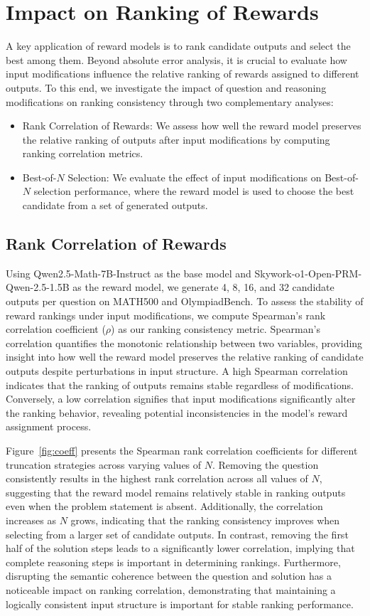 \documentclass{article}
\begin{document}
\section{Impact on Ranking of Rewards}\label{sec:bon}
A key application of reward models is to rank candidate outputs and select the best among them. Beyond absolute error analysis, it is crucial to evaluate how input modifications influence the relative ranking of rewards assigned to different outputs. To this end, we investigate the impact of question and reasoning modifications on ranking consistency through two complementary analyses:
\begin{itemize}
    \item Rank Correlation of Rewards: We assess how well the reward model preserves the relative ranking of outputs after input modifications by computing ranking correlation metrics.
    \item Best-of-$N$ Selection: We evaluate the effect of input modifications on Best-of-$N$ selection performance, where the reward model is used to choose the best candidate from a set of generated outputs.
\end{itemize}
\subsection{Rank Correlation of Rewards}
Using Qwen2.5-Math-7B-Instruct as the base model and Skywork-o1-Open-PRM-Qwen-2.5-1.5B as the reward model, we generate 4, 8, 16, and 32 candidate outputs per question on MATH500 and OlympiadBench. To assess the stability of reward rankings under input modifications, we compute Spearman's rank correlation coefficient ($\rho$) as our ranking consistency metric. Spearman’s correlation quantifies the monotonic relationship between two variables, providing insight into how well the reward model preserves the relative ranking of candidate outputs despite perturbations in input structure. A high Spearman correlation indicates that the ranking of outputs remains stable regardless of modifications. Conversely, a low correlation signifies that input modifications significantly alter the ranking behavior, revealing potential inconsistencies in the model’s reward assignment process.

Figure~\ref{fig:coeff} presents the Spearman rank correlation coefficients for different truncation strategies across varying values of 
$N$. Removing the question consistently results in the highest rank correlation across all values of 
$N$, suggesting that the reward model remains relatively stable in ranking outputs even when the problem statement is absent. Additionally, the correlation increases as $N$ grows, indicating that the ranking consistency improves when selecting from a larger set of candidate outputs. In contrast, removing the first half of the solution steps leads to a significantly lower correlation, implying that complete reasoning steps is important in determining rankings. Furthermore, disrupting the semantic coherence between the question and solution has a noticeable impact on ranking correlation, demonstrating that maintaining a logically consistent input structure is important for stable ranking performance.
\end{document}
